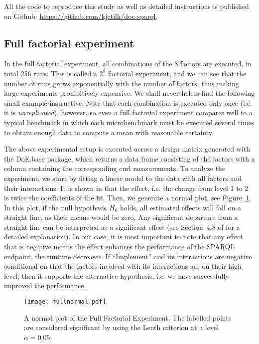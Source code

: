 \documentclass{llncs}
\begin{document}
All the code to reproduce this study as well as detailed instructions
is published on Github: \url{https://github.com/kjetilk/doe-sparql}.

\subsection{Full factorial experiment}\label{sec:full}

In the full factorial experiment, all combinations of the 8 factors
are executed, in total 256 runs. This is called a $2^8$ factorial
experiment, and we can see that the number of runs grows exponentially
with the number of factors, thus making large experiments
prohibitively expensive. We shall nevertheless find the following
small example instructive. Note that each combination is executed only
once (i.e. it is \emph{unreplicated}), however, so even a full
factorial experiment compares well to a typical benchmark in which
each microbenchmark must be executed several times to obtain enough
data to compute a mean with reasonable certainty.

The above experimental setup is executed across a design matrix
generated with the DoE.base package, which returns a data frame
consisting of the factors with a column containing the corresponding
curl measurements. To analyze the experiment, we start by fitting a
linear model to the data with all factors and their interactions. It
is shown in \cite{wu2009experiments} that the effect, i.e. the change
from level 1 to 2 is twice the coefficients of the fit. Then, we
generate a normal plot, see Figure~\ref{fig:fullnormal}. In this plot,
if the null hypothesis $H_0$ holds, all estimated effects will fall on
a straight line, as their means would be zero. Any significant
departure from a straight line can be interpreted as a significant
effect (see Section~4.8 of \cite{wu2009experiments} for a detailed
explanation). In our case, it is most important to note that any
effect that is negative means the effect enhances the performance of
the SPARQL endpoint, the runtime decreases. If ``Implement'' and its
interactions are negative conditional on that the factors involved
with its interactions are on their high level, then it supports the
alternative hypothesis, i.e. we have successfully improved the
performance.

\begin{figure}[h!]
  \texttt{[image: fullnormal.pdf]}
  \caption{A normal plot of the Full Factorial Experiment. The
    labelled points are considered significant by using the Lenth
    criterion at a level $\alpha=0.05$.}\label{fig:fullnormal}
\end{figure}
\end{document}
